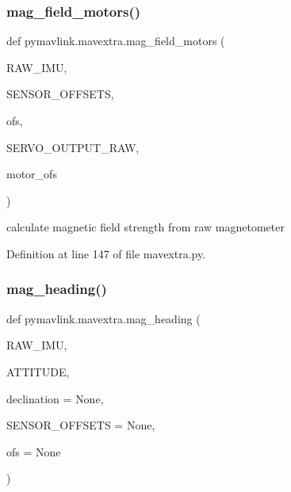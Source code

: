 \mbox{\label{namespacepymavlink_1_1mavextra_afd8e63b1dd36777b854b99782f284831}} 
\subsubsection{\texorpdfstring{mag\_field\_motors()}{mag\_field\_motors()}}
{\footnotesize\ttfamily def pymavlink.\+mavextra.\+mag\+\_\+field\+\_\+motors (\begin{DoxyParamCaption}\item[{}]{R\+A\+W\+\_\+\+I\+MU,  }\item[{}]{S\+E\+N\+S\+O\+R\+\_\+\+O\+F\+F\+S\+E\+TS,  }\item[{}]{ofs,  }\item[{}]{S\+E\+R\+V\+O\+\_\+\+O\+U\+T\+P\+U\+T\+\_\+\+R\+AW,  }\item[{}]{motor\+\_\+ofs }\end{DoxyParamCaption})}

\begin{DoxyVerb}calculate magnetic field strength from raw magnetometer\end{DoxyVerb}
 

Definition at line 147 of file mavextra.\+py.

\mbox{\label{namespacepymavlink_1_1mavextra_aa27cdc29ee82e3515eace9a8a98c331b}} 
\subsubsection{\texorpdfstring{mag\_heading()}{mag\_heading()}}
{\footnotesize\ttfamily def pymavlink.\+mavextra.\+mag\+\_\+heading (\begin{DoxyParamCaption}\item[{}]{R\+A\+W\+\_\+\+I\+MU,  }\item[{}]{A\+T\+T\+I\+T\+U\+DE,  }\item[{}]{declination = {\ttfamily None},  }\item[{}]{S\+E\+N\+S\+O\+R\+\_\+\+O\+F\+F\+S\+E\+TS = {\ttfamily None},  }\item[{}]{ofs = {\ttfamily None} }\end{DoxyParamCaption})}

